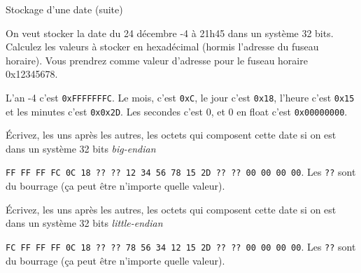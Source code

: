 \begin{exercice}
  \begin{exercicelet}{Stockage d'une date (suite)}
    \begin{questions}
    \item On veut stocker la date du 24 décembre -4 à 21h45 dans un système 32
      bits. Calculez les valeurs à stocker en hexadécimal (hormis l'adresse du
      fuseau horaire). Vous prendrez comme valeur d'adresse pour le fuseau
      horaire 0x12345678.
      \begin{xcorrection}
        L'an -4 c'est \texttt{0xFFFFFFFC}. Le mois, c'est \texttt{0xC}, le jour c'est \texttt{0x18}, l'heure c'est \texttt{0x15} et les minutes c'est \texttt{0x0x2D}. Les secondes c'est 0, et 0 en float c'est \texttt{0x00000000}.
      \end{xcorrection}
    \item Écrivez, les uns après les autres, les octets qui composent cette
      date si on est dans un système 32 bits \emph{big-endian}
      \begin{xcorrection}
        \texttt{FF FF FF FC 0C 18 ?? ?? 12 34 56 78 15 2D ?? ?? 00 00 00 00}.
        Les \texttt{??} sont du bourrage (ça peut être n'importe quelle
        valeur).
      \end{xcorrection}
    \item Écrivez, les uns après les autres, les octets qui composent cette
      date si on est dans un système 32 bits \emph{little-endian}
      \begin{xcorrection}
        \texttt{FC FF FF FF 0C 18 ?? ?? 78 56 34 12 15 2D ?? ?? 00 00 00 00}.
        Les \texttt{??} sont du bourrage (ça peut être n'importe quelle
        valeur).
      \end{xcorrection}
    \end{questions}
  \end{exercicelet}
\end{exercice}
